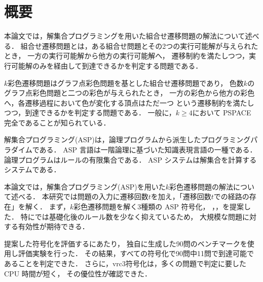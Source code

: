 \chapter*{概要}

本論文では，解集合プログラミングを用いた組合せ遷移問題の解法について述べる．
組合せ遷移問題とは，ある組合せ問題とその2つの実行可能解が与えられたとき，
一方の実行可能解から他方の実行可能解へ，
遷移制約を満たしつつ，実行可能解のみを経由して到達できるかを判定する問題である．

$k$彩色遷移問題はグラフ点彩色問題を基とした組合せ遷移問題であり，
色数$k$のグラフ点彩色問題と二つの彩色が与えられたとき，
一方の彩色から他方の彩色へ，各遷移過程において色が変化する頂点はただ一つ
という遷移制約を満たしつつ，到達できるかを判定する問題である．
一般に，$k \ge 4$において PSPACE 完全であることが知られている．

解集合プログラミング(ASP)は，論理プログラムから派生したプログラミングパラダイムである．
ASP 言語は一階論理に基づいた知識表現言語の一種である．
論理プログラムはルールの有限集合である．
ASP システムは解集合を計算するシステムである．

本論文では，解集合プログラミング(ASP)を用いた$k$彩色遷移問題の解法について述べる．
本研究では問題の入力に遷移回数$t$を加え，「遷移回数$t$での経路の存在」を解く．
まず，$k$彩色遷移問題を解く3種類の ASP 符号化，
，，を提案した．
特にでは基礎化後のルール数を少なく抑えているため，
大規模な問題に対する有効性が期待できる．

提案した符号化を評価するにあたり，
独自に生成した90問のベンチマークを使用し評価実験を行った．
その結果，すべての符号化で90問中11問で到達可能であることを判定できた．
さらに，\textsf{vrc3}符号化は，多くの問題で判定に要した CPU 時間が短く，
その優位性が確認できた．

